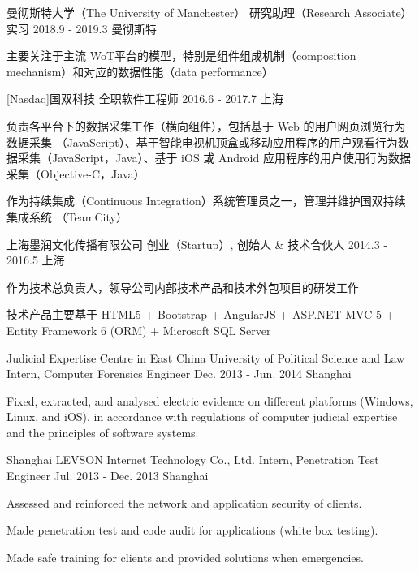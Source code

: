 \begin{cventries}
	  \cventry
	{曼彻斯特大学（The University of Manchester）}
	{研究助理（Research Associate）实习}
	{2018.9 - 2019.3}
	{曼彻斯特}
	{
		\begin{cvitems}
			\item { 主要关注于主流 WoT平台的模型，特别是组件组成机制（composition mechanism）和对应的数据性能（data performance）}
		\end{cvitems}
	}

  \cventry
    {[Nasdaq]国双科技}
    {全职软件工程师}
    {2016.6 - 2017.7}
    {上海}
    {
      \begin{cvitems}
        \item {负责各平台下的数据采集工作（横向组件），包括基于 Web 的用户网页浏览行为数据采集 （JavaScript）、基于智能电视机顶盒或移动应用程序的用户观看行为数据采集（JavaScript，Java）、基于 iOS 或 Android 应用程序的用户使用行为数据采集（Objective-C，Java）}
        \item {作为持续集成（Continuous Integration）系统管理员之一，管理并维护国双持续集成系统 （TeamCity）}
      \end{cvitems}
    }
    
  \cventry
    {上海墨润文化传播有限公司}
    {创业（Startup）, 创始人 \& 技术合伙人}
    {2014.3 - 2016.5}
    { 上海}
    {
      \begin{cvitems}
        \item {作为技术总负责人，领导公司内部技术产品和技术外包项目的研发工作}
        \item {技术产品主要基于 HTML5 + Bootstrap + AngularJS + ASP.NET MVC 5 + Entity Framework 6 (ORM) + Microsoft SQL Server}
      \end{cvitems}
    }
    
  \cventry
    {Judicial Expertise Centre in East China University of Political Science and Law}
    {Intern, Computer Forensics Engineer}
    {Dec. 2013 - Jun. 2014}
    {Shanghai}
    {
      \begin{cvitems}
        \item {Fixed, extracted, and analysed electric evidence on different platforms (Windows, Linux, and iOS), in accordance with regulations of computer judicial expertise and the principles of software systems.}
      \end{cvitems} 
    }
    
  \cventry
    {Shanghai LEVSON Internet Technology Co., Ltd.}
    {Intern, Penetration Test Engineer}
    {Jul. 2013 - Dec. 2013}
    {Shanghai}
    {
      \begin{cvitems}
        \item {Assessed and reinforced the network and application security of clients.}
        \item {Made penetration test and code audit for applications (white box testing).}
        \item {Made safe training for clients and provided solutions when emergencies.}
      \end{cvitems}
    }

\end{cventries}
